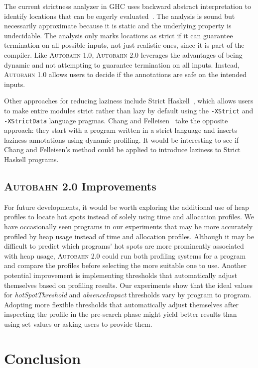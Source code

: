 \documentclass[format=sigplan, review=true]{acmart}
\newcommand{\hotspots}[0]{hot spots}
\newcommand{\hotspotcost}[0]{\textit{hotSpotThreshold}}
\newcommand{\Ao}[0]{\textsc{Autobahn 1.0}}
\newcommand{\At}[0]{\textsc{Autobahn 2.0}}
\newcommand{\preopt}[0]{pre-search}
\newcommand{\absim}[0]{\textit{absenceImpact}}
\begin{document}
The current strictness analyzer in GHC uses backward abstract
interpretation to identify locations that can be eagerly
evaluated~\cite{Sergey14}. The analysis is sound but necessarily
approximate because it is static and the underlying property is
undecidable. The analysis only marks locations as strict if it can
guarantee termination on all possible inputs, not just realistic ones,
since it is part of the compiler.  Like \Ao{}, \At{} leverages the
advantages of being dynamic and not attempting to guarantee
termination on all inputs.  Instead, \Ao{} allows users to decide if
the annotations are safe on the intended inputs.

Other approaches for reducing laziness include Strict
Haskell~\cite{strict-haskell}, which allows users to make entire modules strict rather than
lazy by default using the \texttt{-XStrict} and \texttt{-XStrictData} language
pragmas. Chang and Felleisen~\cite{Chang14} take the opposite
approach: they start with a program written in a strict
language and inserts laziness annotations using dynamic
profiling. It would be interesting to see if Chang and Felleisen's
method could be applied to introduce laziness to Strict Haskell
programs.

\subsection{\At{} Improvements}
For future developments, it would be worth exploring the additional
use of heap profiles to locate hot spots instead of solely using time
and allocation profiles. We have occasionally seen programs in our
experiments that may be more accurately profiled by heap usage instead
of time and allocation profiles. Although it may be difficult to
predict which programs' \hotspots{} are more prominently associated
with heap usage, \At{} could run both profiling systems for a program
and compare the profiles before selecting the more suitable one to
use. Another potential improvement is implementing thresholds
that automatically adjust themselves based on profiling results. Our
experiments show that the ideal values for \hotspotcost{} and \absim{}
thresholds vary by program to program. Adopting more flexible
thresholds that automatically adjust themselves after inspecting the
profile in the \preopt{} phase might yield better results than using
set values or asking users to provide them.


\section{Conclusion}
\end{document}
